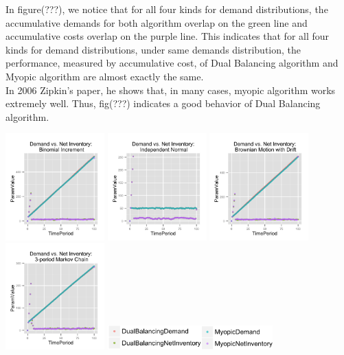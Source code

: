 \documentclass[twoside]{article}
\begin{document}
\begin{multicols}{2}
In figure(???), we notice that for all four kinds for demand distributions, the accumulative demands for both algorithm overlap on the green line and accumulative costs overlap on the purple line. This indicates that for all four kinds for demand distributions, under same demands distribution, the performance, measured by accumulative cost, of Dual Balancing algorithm and Myopic algorithm are almost exactly the same.\\
In 2006 Zipkin's paper\cite{CLAcha1}, he shows that, in many cases, myopic algorithm works extremely well. Thus, fig(???) indicates a good behavior of Dual Balancing algorithm.

  \includegraphics[width=1.5in]{figures/DemandAndNetInventory_Binomial.png}
  \includegraphics[width=1.5in]{figures/DemandAndNetInventory_Normal.png}
  \includegraphics[width=1.5in]{figures/DemandAndNetInventory_Brownian.png}
  \includegraphics[width=1.5in]{figures/DemandAndNetInventory_Markov.png}
  \includegraphics[width=2.5in]{figures/key2.png}


\end{multicols}
\end{document}

